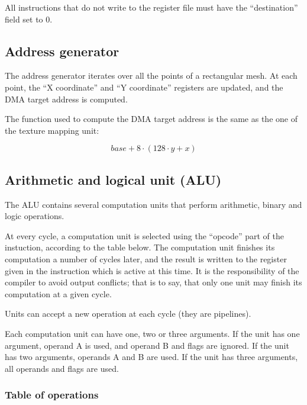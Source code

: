 \documentclass[a4paper,11pt]{article}
\begin{document}
All instructions that do not write to the register file must have the ``destination'' field set to 0.

\subsection{Address generator}
The address generator iterates over all the points of a rectangular mesh. At each point, the ``X coordinate'' and ``Y coordinate'' registers are updated, and the DMA target address is computed.

The function used to compute the DMA target address is the same as the one of the texture mapping unit:

\begin{equation*}
base + 8 \cdot (128 \cdot y + x)
\end{equation*}

\subsection{Arithmetic and logical unit (ALU)}
The ALU contains several computation units that perform arithmetic, binary and logic operations.

At every cycle, a computation unit is selected using the ``opcode'' part of the instuction, according to the table below. The computation unit finishes its computation a number of cycles later, and the result is written to the register given in the instruction which is active at this time. It is the responsibility of the compiler to avoid output conflicts; that is to say, that only one unit may finish its computation at a given cycle.

Units can accept a new operation at each cycle (they are pipelines).

Each computation unit can have one, two or three arguments. If the unit has one argument, operand A is used, and operand B and flags are ignored. If the unit has two arguments, operands A and B are used. If the unit has three arguments, all operands and flags are used.

\subsubsection{Table of operations}
\end{document}

